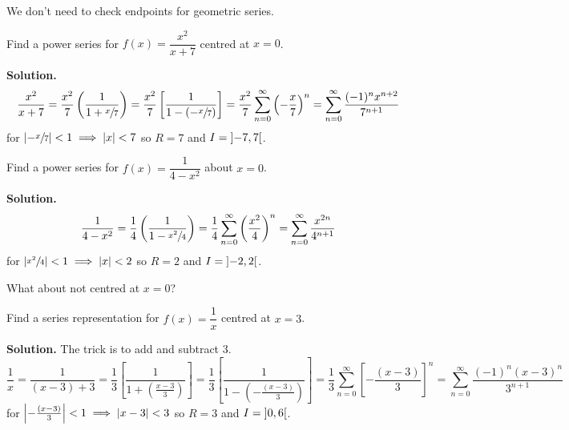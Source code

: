 \begin{Remark}{}{}
    We don't need to check endpoints for geometric series.
\end{Remark}

\begin{Example}{}{}
    Find a power series for $ f(x)=\dfrac{x^2}{x+7} $ centred at $ x=0 $.

    \textbf{Solution.}
    \[ \frac{x^2}{x+7}
        =\frac{x^2}{7} \left( \frac{1}{1+\sfrac{x}{7}} \right)
        =\frac{x^2}{7} \left[ \frac{1}{1-\left( -\sfrac{x}{7}  \right)}  \right]
        =\frac{x^2}{7} \sum\limits_{n=0}^{\infty}\left( -\frac{x}{7} \right)^n
        =\sum\limits_{n=0}^{\infty} \frac{(-1)^n x^{n+2}}{7^{n+1}}  \]
    for $ \abs*{-\sfrac{x}{7}}<1\implies
        \abs{x}<7 $ so $ R=7 $ and $ I=\interval[open]{-7}{7} $.
\end{Example}


\begin{Example}{}{}
    Find a power series for $ f(x)=\dfrac{1}{4-x^2} $ about $ x=0 $.

    \textbf{Solution.}
    \[ \frac{1}{4-x^2}=
        \frac{1}{4} \left( \frac{1}{1-\sfrac{x^2}{4}}  \right)
        =\frac{1}{4} \sum\limits_{n=0}^{\infty}
        \left( \frac{x^2}{4} \right)^n
        =\sum\limits_{n=0}^{\infty} \frac{x^{2n}}{4^{n+1}} \]
    for $ \abs*{\sfrac{x^2}{4}}<1\implies \abs{x}<2 $ so $ R=2 $
    and $ I=\interval[open]{-2}{2} $.
\end{Example}

What about not centred at $ x=0 $?

\begin{Example}{}{}
    Find a series representation for $ f(x)=\dfrac{1}{x} $
    centred at $ x=3 $.

    \textbf{Solution.} The trick is to add and subtract 3.
    \[ \frac{1}{x} =
        \frac{1}{(x-3)+3}
        =\frac{1}{3} \left[ \frac{1}{1+\left( \frac{x-3}{3} \right)}  \right]
        =\frac{1}{3} \left[ \frac{1}{1-\left( -\frac{(x-3)}{3} \right)}  \right]
        =\frac{1}{3} \sum\limits_{n=0}^{\infty} \left[ -\frac{(x-3)}{3} \right]^n
        =\sum\limits_{n=0}^{\infty} \frac{(-1)^n (x-3)^n}{3^{n+1}}  \]
    for $ \abs*{-\frac{(x-3)}{3}}<1\implies \abs{x-3}<3 $
    so $ R=3 $ and $ I=\interval[open]{0}{6} $.
\end{Example}

